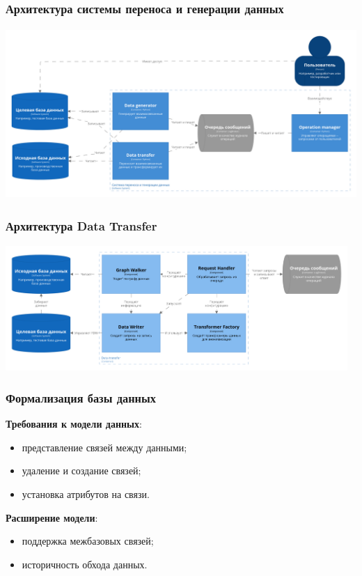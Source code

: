 \documentclass[pdf, hyperref={unicode}, aspectratio=169]{beamer}
\begin{document}
\begin{frame}
\frametitle{Архитектура системы переноса и генерации данных}
	\begin{center}
		\includegraphics[height = 6.5cm]{img/structurizr-Containers-cut}
	\end{center}
\end{frame}


\begin{frame}
\frametitle{Архитектура Data Transfer}
	\begin{center}
		\includegraphics[width = 13cm]{img/structurizr-DataTransferComponents-cut}
	\end{center}
\end{frame}


\begin{frame}
\frametitle{Формализация базы данных}
	\textbf{Требования к модели данных}:
	\begin{itemize}
		\item представление связей между данными;
		\item удаление и создание связей;
		\item установка атрибутов на связи.
	\end{itemize}

	\textbf{Расширение модели}:
	\begin{itemize}
		\item поддержка межбазовых связей;
		\item историчность обхода данных.
	\end{itemize}
\end{frame}
\end{document}
